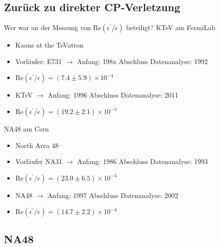 \documentclass[aspectratio=1610, professionalfonts, 9pt, t]{beamer}
\begin{document}
  \subsection{Zurück zu direkter CP-Verletzung}

  \begin{frame}{Wer war an der Messung von Re$(\epsilon^{\prime} / \epsilon)$ beteiligt?}
    KTeV am FermiLab
    \begin{itemize}
      \item Kaons at the TeVatron
      \item Vorläufer: E731 $\rightarrow$ Anfang: 198x Abschluss Datenanalyse: 1992
      \item[\rightarrow] Re$(\epsilon^{\prime} / \epsilon) = (7.4\pm5.9) \times10^{-4}$
      \item KTeV $\rightarrow$ Anfang: 1996 Abschluss Datenanalyse: 2011
      \item[\rightarrow] Re$(\epsilon^{\prime} / \epsilon) = (19.2\pm2.1) \times10^{-4}$
    \end{itemize}
    NA48 am Cern
    \begin{itemize}
      \item North Area 48
      \item Vorläufer NA31 $\rightarrow$ Anfang: 1986 Abschluss Datenanalyse: 1993
      \item[\rightarrow] Re$(\epsilon^{\prime} / \epsilon) = (23.0\pm6.5) \times10^{-4}$
      \item NA48 $\rightarrow$ Anfang: 1997 Abschluss Datenanalyse: 2002
      \item[\rightarrow] Re$(\epsilon^{\prime} / \epsilon) = (14.7\pm2.2) \times10^{-4}$
    \end{itemize}
  \end{frame}

  \subsection{NA48}
\end{document}
